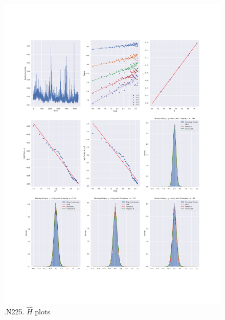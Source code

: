 	\begin{figure}[h]
		\centering
		\includegraphics[width=\linewidth]{fig/.N225.pdf}
		\caption{.N225. $\hat{H}$ plots}
	\end{figure}

